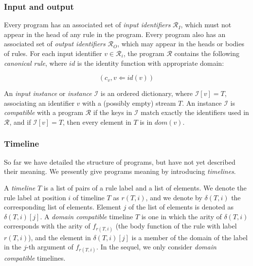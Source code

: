 \subsubsection{Input and output}

Every program has an associated set of {\em input identifiers} $\mathcal{R}_I$, which must not appear in the head of any rule in the program.  Every program also has an associated set of {\em output identifiers} $\mathcal{R}_O$, which may appear in the heads or bodies of rules.  For each input identifier $v \in \mathcal{R}_i$, the program $\mathcal{R}$ contains the following {\em canonical rule}, where $id$ is the identity function with appropriate domain:

$$(c_v, v \Leftarrow id(v)) $$

An {\em input instance} or {\em instance} $\mathcal{I}$ is an ordered dictionary, where $\mathcal{I}[v] = T$, associating an identifier $v$ with a (possibly empty) stream $T$.  An instance $\mathcal{I}$ is {\em compatible} with a program $\mathcal{R}$ if the keys in $\mathcal{I}$ match exactly the identifiers used in $\mathcal{R}$, and if $\mathcal{I}[v] = T$, then every element in $T$ is in $dom(v)$.

\subsubsection{Timeline}

So far we have detailed the structure of programs, but have not yet described their meaning.  We presently give programs meaning by introducing {\em timelines}.

A {\em timeline} $T$ is a list of pairs of a rule label and a list of elements.  We denote the rule label at position $i$ of timeline $T$ as $r(T, i)$, and we denote by $\delta(T, i)$ the corresponding list of elements.  Element $j$ of the list of elements is denoted as $\delta(T,i)[j]$.  A {\em domain compatible} timeline $T$ is one in which the arity of $\delta(T, i)$ corresponds with the arity of $f_{r(T,i)}$ (the body function of the rule with label $r(T,i)$), and the element in $\delta(T,i)[j]$ is a member of the domain of the label in the $j$-th argument of $f_{r(T,i)}$.  In the sequel, we only consider {\em domain compatible} timelines.

